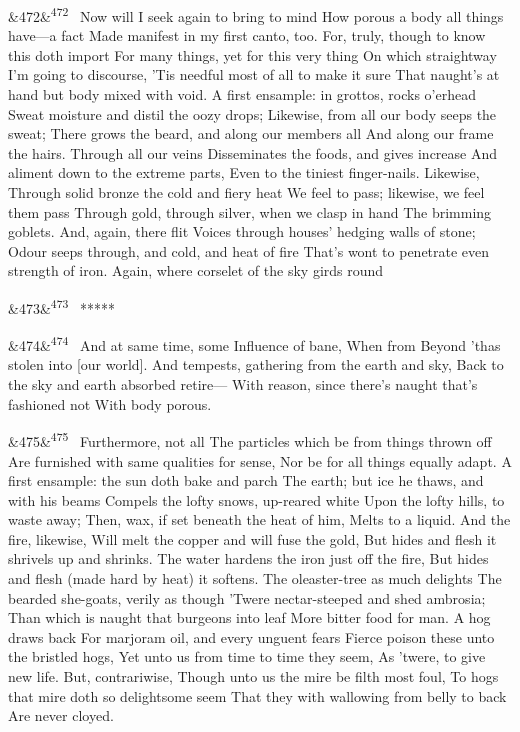 \documentclass[12pt]{article}
\newcommand{\para}[1][]{\par\noindent\ifx&#1&\else\textsuperscript{\footnotesize #1}~\fi}
\begin{document}
\para[472] Now will I seek again to bring to mind How porous a body all things have---a fact Made manifest in my first canto, too. For, truly, though to know this doth import For many things, yet for this very thing On which straightway I'm going to discourse, 'Tis needful most of all to make it sure That naught's at hand but body mixed with void. A first ensample: in grottos, rocks o'erhead Sweat moisture and distil the oozy drops; Likewise, from all our body seeps the sweat; There grows the beard, and along our members all And along our frame the hairs. Through all our veins Disseminates the foods, and gives increase And aliment down to the extreme parts, Even to the tiniest finger-nails. Likewise, Through solid bronze the cold and fiery heat We feel to pass; likewise, we feel them pass Through gold, through silver, when we clasp in hand The brimming goblets. And, again, there flit Voices through houses' hedging walls of stone; Odour seeps through, and cold, and heat of fire That's wont to penetrate even strength of iron. Again, where corselet of the sky girds round

\para[473] *****

\para[474] And at same time, some Influence of bane, When from Beyond 'thas stolen into [our world]. And tempests, gathering from the earth and sky, Back to the sky and earth absorbed retire--- With reason, since there's naught that's fashioned not With body porous.

\para[475] Furthermore, not all The particles which be from things thrown off Are furnished with same qualities for sense, Nor be for all things equally adapt. A first ensample: the sun doth bake and parch The earth; but ice he thaws, and with his beams Compels the lofty snows, up-reared white Upon the lofty hills, to waste away; Then, wax, if set beneath the heat of him, Melts to a liquid. And the fire, likewise, Will melt the copper and will fuse the gold, But hides and flesh it shrivels up and shrinks. The water hardens the iron just off the fire, But hides and flesh (made hard by heat) it softens. The oleaster-tree as much delights The bearded she-goats, verily as though 'Twere nectar-steeped and shed ambrosia; Than which is naught that burgeons into leaf More bitter food for man. A hog draws back For marjoram oil, and every unguent fears Fierce poison these unto the bristled hogs, Yet unto us from time to time they seem, As 'twere, to give new life. But, contrariwise, Though unto us the mire be filth most foul, To hogs that mire doth so delightsome seem That they with wallowing from belly to back Are never cloyed.
\end{document}
